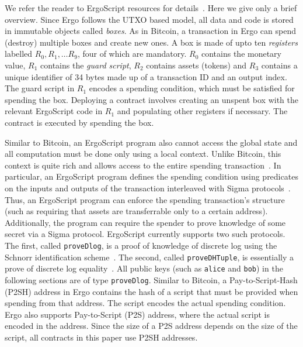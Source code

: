 \documentclass[runningheads]{llncs}
\newcommand{\langname}{ErgoScript\xspace}
\begin{document}
We refer the reader to \langname resources for details~\cite{langrepo,tutorial,advtutorial}. Here we give only a brief overview.
Since Ergo follows the UTXO based model, all data and code is stored in immutable objects called {\em boxes}. As in Bitcoin, a transaction in Ergo can spend (destroy) multiple boxes and create new ones. 
A box is made of upto ten {\em registers} labelled $R_0, R_1,\ldots R_9$, four of which are mandatory. $R_0$ contains the monetary value, $R_1$ contains the {\em guard script}, $R_2$ contains assets (tokens) and $R_3$ contains a unique identifier of 34 bytes made up of a transaction ID and an output index. The guard script in $R_1$ encodes a spending condition, which must be satisfied for spending the box. Deploying a contract involves creating an unspent box with the relevant \langname code in $R_1$ and populating other registers if necessary. The contract is executed by spending the box. %


Similar to Bitcoin, an \langname program also cannot access the global state and all computation must be done only using a local context. Unlike Bitcoin, this context is quite rich and allows access to the entire spending transaction~\cite{tutorial}. 
In particular, an \langname program defines the spending condition using predicates on the inputs and outputs of the transaction interleaved with Sigma protocols~\cite{Dam10}. Thus, an \langname program can enforce the spending transaction's structure (such as requiring that assets are transferrable only to a certain address). Additionally, the program can require the spender to prove knowledge of some secret via a Sigma protocol. \langname currently supports two such protocols. The first, called \texttt{proveDlog}, is a proof of knowledge of discrete log using the Schnorr identification scheme~\cite{Dam10}. The second, called \texttt{proveDHTuple}, is essentially a prove of discrete log equality~\cite{advtutorial}. All public keys (such as \texttt{alice} and \texttt{bob}) in the following sections are of type \texttt{proveDlog}. Similar to Bitcoin, a Pay-to-Script-Hash (P2SH) address in Ergo contains the hash of a script that must be provided when spending from that address. The script encodes the actual spending condition. Ergo also supports Pay-to-Script (P2S) address, where the actual script is encoded in the address. Since the size of a P2S address depends on the size of the script, all contracts in this paper use P2SH addresses.
\end{document}
